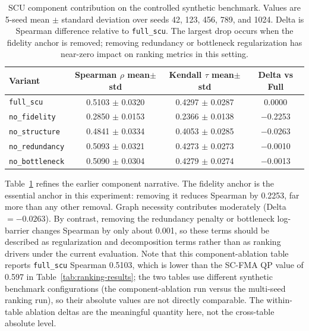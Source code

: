 \documentclass[a4paper,fleqn]{cas-sc}
\begin{document}
\begin{table}[ht]
\caption{SCU component contribution on the controlled synthetic benchmark. Values are 5-seed mean $\pm$ standard deviation over seeds 42, 123, 456, 789, and 1024. Delta is Spearman difference relative to \texttt{full\_scu}. The largest drop occurs when the fidelity anchor is removed; removing redundancy or bottleneck regularization has near-zero impact on ranking metrics in this setting.}
\label{tab:scu-component-contribution}
\centering
\small
\renewcommand{\arraystretch}{1.08}
\begin{tabular}{lccc}
\toprule
\textbf{Variant} & \textbf{Spearman $\rho$ mean$\pm$std} & \textbf{Kendall $\tau$ mean$\pm$std} & \textbf{Delta vs Full} \\
\midrule
\texttt{full\_scu} & 0.5103 $\pm$ 0.0320 & 0.4297 $\pm$ 0.0287 & 0.0000 \\
\texttt{no\_fidelity} & 0.2850 $\pm$ 0.0153 & 0.2366 $\pm$ 0.0138 & $-$0.2253 \\
\texttt{no\_structure} & 0.4841 $\pm$ 0.0334 & 0.4053 $\pm$ 0.0285 & $-$0.0263 \\
\texttt{no\_redundancy} & 0.5093 $\pm$ 0.0321 & 0.4273 $\pm$ 0.0273 & $-$0.0010 \\
\texttt{no\_bottleneck} & 0.5090 $\pm$ 0.0304 & 0.4279 $\pm$ 0.0274 & $-$0.0013 \\
\bottomrule
\end{tabular}
\end{table}

Table~\ref{tab:scu-component-contribution} refines the earlier component narrative. The fidelity anchor is the essential anchor in this experiment: removing it reduces Spearman by 0.2253, far more than any other removal. Graph necessity contributes moderately (Delta $=-0.0263$). By contrast, removing the redundancy penalty or bottleneck log-barrier changes Spearman by only about 0.001, so these terms should be described as regularization and decomposition terms rather than as ranking drivers under the current evaluation. Note that this component-ablation table reports \texttt{full\_scu} Spearman 0.5103, which is lower than the SC-FMA QP value of 0.597 in Table~\ref{tab:ranking-results}; the two tables use different synthetic benchmark configurations (the component-ablation run versus the multi-seed ranking run), so their absolute values are not directly comparable. The within-table ablation deltas are the meaningful quantity here, not the cross-table absolute level.
\end{document}
